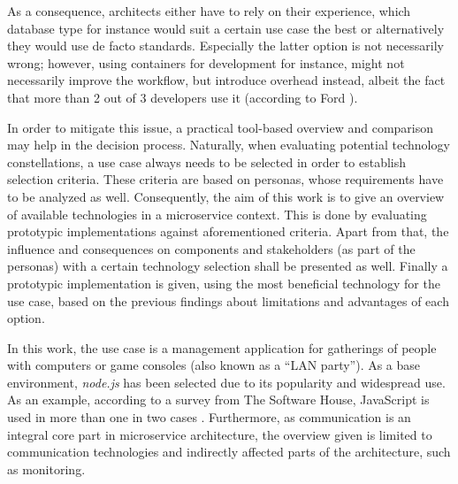 As a consequence, architects either have to rely on their experience, which database type for instance would suit a certain use case the best or alternatively they would use de facto standards.
Especially the latter option is not necessarily wrong; however, using containers for development for instance, might not necessarily improve the workflow, but introduce overhead instead, albeit the fact that more than 2 out of 3 developers use it (according to Ford \cite{Ford.2018}).

In order to mitigate this issue, a practical tool-based overview and comparison may help in the decision process.
Naturally, when evaluating potential technology constellations, a use case always needs to be selected in order to establish selection criteria.
These criteria are based on personas, whose requirements have to be analyzed as well.
Consequently, the aim of this work is to give an overview of available technologies in a microservice context.
This is done by evaluating prototypic implementations against aforementioned criteria.
Apart from that, the influence and consequences on components and stakeholders (as part of the personas) with a certain technology selection shall be presented as well.
Finally a prototypic implementation is given, using the most beneficial technology for the use case, based on the previous findings about limitations and advantages of each option.

In this work, the use case is a management application for gatherings of people with computers or game consoles (also known as a \enquote{LAN party}). As a base environment, \textit{node.js} has been selected due to its popularity and widespread use.
As an example, according to a survey from The Software House, JavaScript is used in more than one in two cases \cite[p.~25]{Mamczur.2020}.
Furthermore, as communication is an integral core part in microservice architecture, the overview given is limited to communication technologies and indirectly affected parts of the architecture, such as monitoring.
